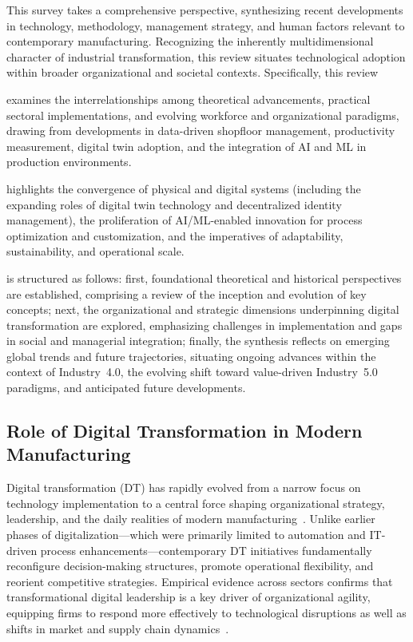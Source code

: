 \documentclass[sigconf]{acmart}
\begin{document}
This survey takes a comprehensive perspective, synthesizing recent developments in technology, methodology, management strategy, and human factors relevant to contemporary manufacturing. Recognizing the inherently multidimensional character of industrial transformation, this review situates technological adoption within broader organizational and societal contexts. Specifically, this review

examines the interrelationships among theoretical advancements, practical sectoral implementations, and evolving workforce and organizational paradigms, drawing from developments in data-driven shopfloor management, productivity measurement, digital twin adoption, and the integration of AI and ML in production environments.

highlights the convergence of physical and digital systems (including the expanding roles of digital twin technology and decentralized identity management), the proliferation of AI/ML-enabled innovation for process optimization and customization, and the imperatives of adaptability, sustainability, and operational scale.

is structured as follows: first, foundational theoretical and historical perspectives are established, comprising a review of the inception and evolution of key concepts; next, the organizational and strategic dimensions underpinning digital transformation are explored, emphasizing challenges in implementation and gaps in social and managerial integration; finally, the synthesis reflects on emerging global trends and future trajectories, situating ongoing advances within the context of Industry~4.0, the evolving shift toward value-driven Industry~5.0 paradigms, and anticipated future developments.

\subsection{Role of Digital Transformation in Modern Manufacturing}

Digital transformation (DT) has rapidly evolved from a narrow focus on technology implementation to a central force shaping organizational strategy, leadership, and the daily realities of modern manufacturing~\cite{ref93}. Unlike earlier phases of digitalization—which were primarily limited to automation and IT-driven process enhancements—contemporary DT initiatives fundamentally reconfigure decision-making structures, promote operational flexibility, and reorient competitive strategies. Empirical evidence across sectors confirms that transformational digital leadership is a key driver of organizational agility, equipping firms to respond more effectively to technological disruptions as well as shifts in market and supply chain dynamics~\cite{ref93}. 
\end{document}

